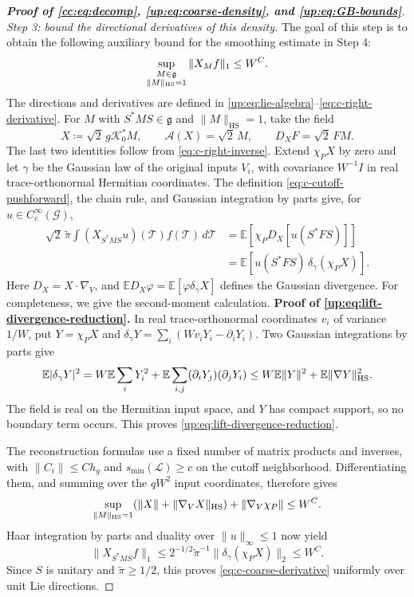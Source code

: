 \documentclass[11pt]{article}
\numberwithin{equation}{section}
\theoremstyle{remark}
\newcommand{\E}{\mathbb E}
\newcommand{\HS}{\mathrm{HS}}
\begin{document}
\begin{proof}[\textbf{Proof of \eqref{cc:eq:decomp}, \eqref{up:eq:coarse-density}, and \eqref{up:eq:GB-bounds}}]
\medskip\noindent\emph{Step 3: bound the directional derivatives of this density.}
The goal of this step is to obtain the following auxiliary bound for
the smoothing estimate in Step 4:
\begin{equation}\label{eq:c-coarse-derivative}
 \sup_{\substack{M\in\mathfrak g\\\|M\|_{\rm HS}=1}}
       \|X_Mf\|_1\le W^C.
\end{equation}
The directions and derivatives are defined in
\eqref{up:eq:lie-algebra}--\eqref{eq:c-right-derivative}.
For $M$ with $S^*MS\in\mathfrak g$ and $\|M\|_{\HS}=1$,
take the field
\[
 X\coloneqq\sqrt2\,g\mathcal K_0^*M,\qquad
 \mathcal A(X)=\sqrt2\,M,\qquad D_XF=\sqrt2\,FM.
\]
The last two identities follow from \eqref{eq:c-right-inverse}.
Extend $\chi_P X$ by zero and let $\gamma$ be the Gaussian law of the
original inputs $V_i$, with covariance $W^{-1}I$ in real
trace-orthonormal Hermitian coordinates. The definition
\eqref{eq:c-cutoff-pushforward}, the chain rule, and Gaussian integration
by parts \cite[Lemma~4.2]{Drogin} give, for $u\in C_c^\infty(\mathcal G)$,
\[
 \begin{aligned}
 \sqrt2\,\widetilde\pi\int (X_{S^*MS}u)(\mathcal T)f(\mathcal T)\,d\mathcal T
 &=\E[\chi_P D_X[u(S^*FS)]]\\
 &=\E[u(S^*FS)\,\delta_\gamma(\chi_P X)].
 \end{aligned}
\]
Here $D_X=X\cdot\nabla_V$, and
$\E D_X\varphi=\E[\varphi\delta_\gamma X]$ defines the Gaussian divergence. For completeness, we give the second-moment calculation.
\smallskip\noindent\textbf{Proof of \eqref{up:eq:lift-divergence-reduction}.}
In real trace-orthonormal coordinates $v_i$ of variance $1/W$, put
$Y=\chi_P X$ and $\delta_\gamma Y=\sum_i(Wv_iY_i-\partial_iY_i)$.
Two Gaussian integrations by parts give
\[
 \E|\delta_\gamma Y|^2
 =W\E\sum_iY_i^2+\E\sum_{i,j}(\partial_iY_j)(\partial_jY_i)
 \le W\E\|Y\|^2+\E\|\nabla Y\|_{\rm HS}^2.
\]
The field is real on the Hermitian input space, and $Y$ has compact
support, so no boundary term occurs. This proves
\eqref{up:eq:lift-divergence-reduction}.\smallskip

The reconstruction formulas use a fixed number of matrix products
and inverses, with $\|C_i\|\le Ch_g$ and $s_{\min}(\mathcal L)\ge c$
on the cutoff neighborhood. Differentiating them, and summing over the
$qW^2$ input coordinates, therefore gives
\[
 \sup_{\|M\|_{\rm HS}=1}
 (\|X\|+\|\nabla_VX\|_{\rm HS})+\|\nabla_V\chi_P\|\le W^C.
\]
Haar integration by parts and duality over $\|u\|_\infty\le1$ now yield
\begin{equation}\label{eq:c-score-to-density}
 \|X_{S^*MS}f\|_1
 \le2^{-1/2}\widetilde\pi^{-1}\|\delta_\gamma(\chi_P X)\|_2\le W^C.
\end{equation}
Since $S$ is unitary and $\widetilde\pi\ge1/2$, this proves
\eqref{eq:c-coarse-derivative} uniformly over unit Lie directions.


\end{proof}
\end{document}
